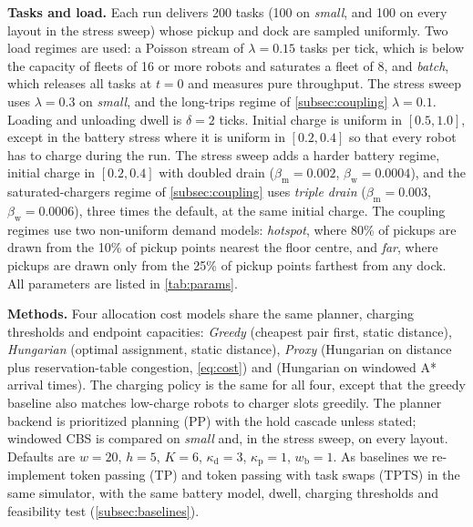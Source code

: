 \noindent\textbf{Tasks and load.}
Each run delivers 200 tasks (100 on \emph{small}, and 100 on every layout
in the stress sweep) whose pickup and dock are
sampled uniformly. Two load regimes are used: a Poisson stream of
$\lambda=0.15$ tasks per tick, which is below the capacity of fleets of 16 or
more robots and saturates a fleet of 8, and \emph{batch}, which releases all
tasks at $t=0$ and measures pure throughput. The stress sweep uses
$\lambda=0.3$ on \emph{small}, and the long-trips regime of
\cref{subsec:coupling} $\lambda=0.1$. Loading and unloading dwell is
$\delta=2$ ticks. Initial charge is uniform in $[0.5,1.0]$, except in the
battery stress where it is uniform in $[0.2,0.4]$ so that every robot has to
charge during the run. The stress sweep adds a harder battery regime, initial
charge in $[0.2,0.4]$ with doubled drain ($\beta_{\mathrm{m}}=0.002$,
$\beta_{\mathrm{w}}=0.0004$), and the saturated-chargers regime of
\cref{subsec:coupling} uses \emph{triple drain} ($\beta_{\mathrm{m}}=0.003$,
$\beta_{\mathrm{w}}=0.0006$), three times the default, at the same initial charge.
The coupling regimes use two non-uniform demand models: \emph{hotspot}, where 80\% of pickups are drawn from the 10\% of
pickup points nearest the floor centre, and \emph{far}, where pickups are
drawn only from the 25\% of pickup points farthest from any dock. All
parameters are listed in \cref{tab:params}.

\noindent\textbf{Methods.}
Four allocation cost models share the same planner, charging thresholds and
endpoint capacities: \emph{Greedy} (cheapest pair first, static distance),
\emph{Hungarian} (optimal assignment, static distance), \emph{Proxy}
(Hungarian on distance plus reservation-table congestion, \cref{eq:cost}) and
\emph{\sname} (Hungarian on windowed A* arrival times). The charging policy is
the same for all four, except that the greedy baseline also matches low-charge
robots to charger slots greedily. The planner backend
is prioritized planning (PP) with the hold cascade unless stated; windowed
CBS is compared on \emph{small} and, in the stress sweep, on every layout.
Defaults are $w=20$, $h=5$, $K=6$, $\kappa_{\mathrm{d}}=3$,
$\kappa_{\mathrm{p}}=1$, $w_{\mathrm{b}}=1$. As baselines we re-implement
token passing (TP) and token passing with task swaps (TPTS)
\citep{ma2017lifelong} in the same simulator, with the same battery model,
dwell, charging thresholds and feasibility test (\cref{subsec:baselines}).

